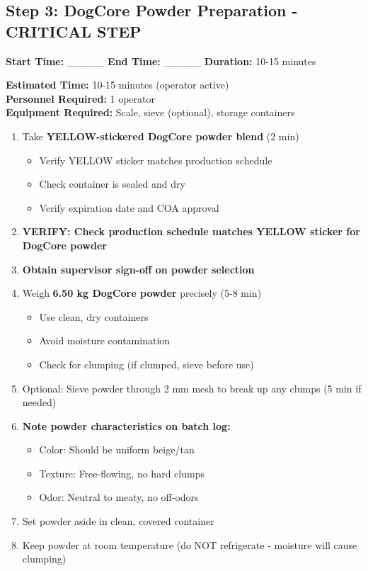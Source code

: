 
\subsection*{Step 3: DogCore Powder Preparation - CRITICAL STEP}

\textbf{Start Time:} \_\_\_\_\_ \hspace{1cm} \textbf{End Time:} \_\_\_\_\_ \hspace{1cm} \textbf{Duration:} 10-15 minutes

\vspace{0.5em}

\textbf{Estimated Time:} 10-15 minutes (operator active) \\
\textbf{Personnel Required:} 1 operator \\
\textbf{Equipment Required:} Scale, sieve (optional), storage containers

\vspace{0.5em}

\begin{enumerate}[leftmargin=1.5em]
\item Take \textbf{YELLOW-stickered DogCore powder blend} (2 min)
  \begin{itemize}
  \item Verify YELLOW sticker matches production schedule
  \item Check container is sealed and dry
  \item Verify expiration date and COA approval
  \end{itemize}
\item \textbf{VERIFY: Check production schedule matches YELLOW sticker for DogCore powder}
\item \textbf{Obtain supervisor sign-off on powder selection}
\item Weigh \textbf{6.50 kg DogCore powder} precisely (5-8 min)
  \begin{itemize}
  \item Use clean, dry containers
  \item Avoid moisture contamination
  \item Check for clumping (if clumped, sieve before use)
  \end{itemize}
\item Optional: Sieve powder through 2 mm mesh to break up any clumps (5 min if needed)
\item \textbf{Note powder characteristics on batch log:}
  \begin{itemize}
  \item Color: Should be uniform beige/tan
  \item Texture: Free-flowing, no hard clumps
  \item Odor: Neutral to meaty, no off-odors
  \end{itemize}
\item Set powder aside in clean, covered container
\item Keep powder at room temperature (do NOT refrigerate - moisture will cause clumping)
\end{enumerate}

